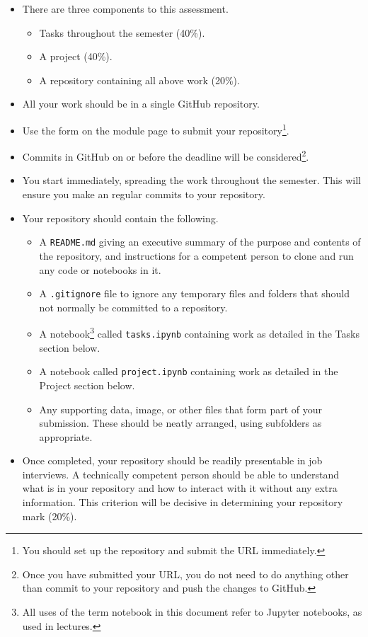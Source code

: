 \documentclass{iansnotes}
\begin{document}
\begin{itemize}
  \item There are three components to this assessment.
  \begin{itemize}
    \item Tasks throughout the semester (40\%).
    \item A project (40\%).
    \item A repository containing all above work (20\%).
  \end{itemize}
  \item All your work should be in a single GitHub repository.
  \item Use the form on the module page to submit your repository\footnote{You should set up the repository and submit the URL immediately.}.
  \item Commits in GitHub on or before the deadline will be considered\footnote{Once you have submitted your URL, you do not need to do anything other than commit to your repository and push the changes to GitHub.}.
  \item You start immediately, spreading the work throughout the semester. This will ensure you make an regular commits to your repository.
  \item Your repository should contain the following.
  \begin{itemize}
    \item A \texttt{README.md} giving an executive summary of the purpose and contents of the repository, and instructions for a competent person to clone and run any code or notebooks in it.
    \item A \texttt{.gitignore} file to ignore any temporary files and folders that should not normally be committed to a repository.
    \item A notebook\footnote{All uses of the term notebook in this document refer to Jupyter notebooks, as used in lectures.} called \texttt{tasks.ipynb} containing work as detailed in the Tasks section below.
    \item A notebook called \texttt{project.ipynb} containing work as detailed in the Project section below.
    \item Any supporting data, image, or other files that form part of your submission. These should be neatly arranged, using subfolders as appropriate.
  \end{itemize}
  \item Once completed, your repository should be readily presentable in job interviews. A technically competent person should be able to understand what is in your repository and how to interact with it without any extra information. This criterion will be decisive in determining your repository mark (20\%).
\end{itemize}
\end{document}
